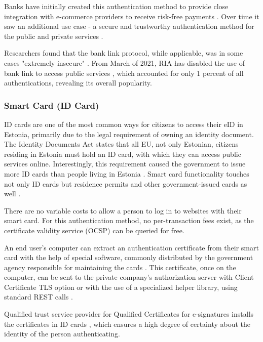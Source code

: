 Banks have initially created this authentication method to provide close integration with e-commerce providers to receive risk-free payments \cite{kerem2003internet}. Over time it saw an additional use case - a secure and trustworthy authentication method for the public and private services \cite{sebbanklink}.

Researchers found that the bank link protocol, while applicable, was in some cases "extremely insecure" \cite{banklinksecurityanalysis}. From March of 2021, RIA has disabled the use of {bank link} to access public services \cite{ria-deprecates-bank-link}, which accounted for only 1 percent of all authentications, revealing its overall popularity.

\subsubsection{Smart Card (ID Card)}

ID cards are one of the most common ways for citizens to access their eID in Estonia, primarily due to the legal requirement of owning an identity document. The Identity Documents Act \cite{eelaw-idcard} states that all EU, not only Estonian, citizens residing in Estonia must hold an ID card, with which they can access public services online. Interestingly, this requirement caused the government to issue more ID cards than people living in Estonia \cite{ria-idee,statee-population}. Smart card functionality touches not only ID cards but residence permits and other government-issued cards as well \cite{eulaw-eidas-notified}.

There are no variable costs to allow a person to log in to websites with their smart card. For this authentication method, no per-transaction fees exist, as the certificate validity service (OCSP) \cite{rfc6960} can be queried for free.

An end user's computer can extract an authentication certificate from their smart card with the help of special software, commonly distributed by the government agency responsible for maintaining the cards \cite{ria-idee}. This certificate, once on the computer, can be sent to the private company's authorization server with Client Certificate TLS option \cite{rfc8446} or with the use of a specialized helper library, using standard REST calls \cite{ria-webeid}.

Qualified trust service provider for Qualified Certificates for e-signatures installs the certificates in ID cards \cite{eu-trustservices}, which ensures a high degree of certainty about the identity of the person authenticating.

